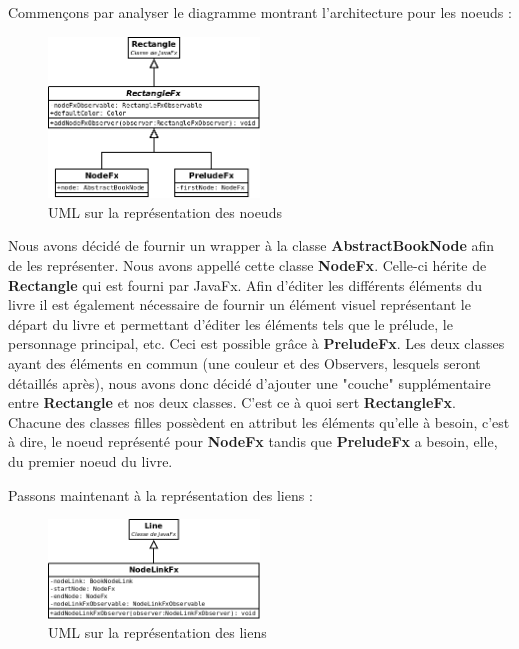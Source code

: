 				Commençons par analyser le diagramme montrant l'architecture pour les noeuds :

				\begin{figure}[H]
					\centering\includegraphics[width=0.5\textwidth, keepaspectratio]{img/NodeFx.png}
					\caption{UML sur la représentation des noeuds}
				\end{figure}

				Nous avons décidé de fournir un wrapper à la classe \textbf{AbstractBookNode} afin de les représenter. Nous avons appellé cette classe \textbf{NodeFx}. Celle-ci hérite de \textbf{Rectangle} qui est fourni par JavaFx. Afin d'éditer les différents éléments du livre il est également nécessaire de fournir un élément visuel représentant le départ du livre et permettant d'éditer les éléments tels que le prélude, le personnage principal, etc. Ceci est possible grâce à \textbf{PreludeFx}. Les deux classes ayant des éléments en commun (une couleur et des Observers, lesquels seront détaillés après), nous avons donc décidé d'ajouter une "couche" supplémentaire entre \textbf{Rectangle} et nos deux classes. C'est ce à quoi sert \textbf{RectangleFx}. Chacune des classes filles possèdent en attribut les éléments qu'elle à besoin, c'est à dire, le noeud représenté pour \textbf{NodeFx} tandis que \textbf{PreludeFx} a besoin, elle, du premier noeud du livre.

				Passons maintenant à la représentation des liens :

				\begin{figure}[H]
					\centering\includegraphics[width=0.5\textwidth, keepaspectratio]{img/NodeLinkFx.png}
					\caption{UML sur la représentation des liens}
				\end{figure}

